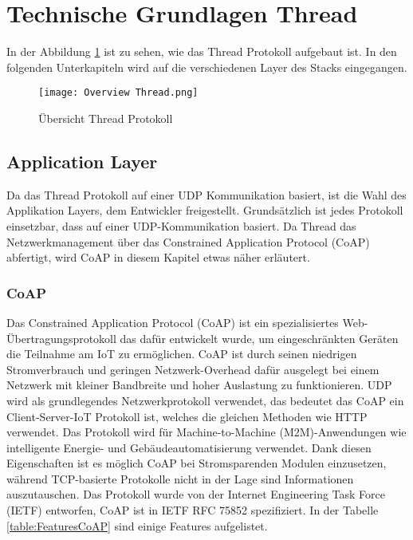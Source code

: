 \clearpage
\section{Technische Grundlagen Thread}\label{sec:TechnischeGrundlagenThread}
In der Abbildung \ref{fig:ÜbersichtThreadProtokoll} ist zu sehen, wie das Thread Protokoll aufgebaut ist. In den folgenden Unterkapiteln wird auf die verschiedenen Layer des Stacks eingegangen.
\begin{figure}[H]
	\centering
	\texttt{[image: Overview Thread.png]}
	\caption{Übersicht Thread Protokoll}\label{fig:ÜbersichtThreadProtokoll}
\end{figure}

\subsection{Application Layer}\label{subsec:CoAP}
Da das Thread Protokoll auf einer UDP Kommunikation basiert, ist die Wahl des Applikation Layers, dem Entwickler freigestellt. Grundsätzlich ist jedes Protokoll einsetzbar, dass auf einer UDP-Kommunikation basiert. Da Thread das Netzwerkmanagement über das Constrained Application Protocol (CoAP) abfertigt, wird CoAP in diesem Kapitel etwas näher erläutert.

\subsubsection{CoAP}\label{subsubsec:CoAP}
Das Constrained Application Protocol (CoAP) ist ein spezialisiertes Web-Übertragungsprotokoll das dafür entwickelt wurde, um eingeschränkten Geräten die Teilnahme am IoT zu ermöglichen. CoAP ist durch seinen niedrigen Stromverbrauch und geringen Netzwerk-Overhead dafür ausgelegt bei einem Netzwerk mit kleiner Bandbreite und hoher Auslastung zu funktionieren.  UDP wird als grundlegendes Netzwerkprotokoll verwendet, das bedeutet das CoAP ein Client-Server-IoT Protokoll ist, welches die gleichen Methoden wie HTTP verwendet. Das Protokoll wird für Machine-to-Machine (M2M)-Anwendungen wie intelligente Energie- und Gebäudeautomatisierung verwendet. Dank diesen Eigenschaften ist es möglich CoAP bei Stromsparenden Modulen einzusetzen, während TCP-basierte Protokolle nicht in der Lage sind Informationen auszutauschen. Das Protokoll wurde von der Internet Engineering Task Force (IETF) entworfen, CoAP ist in IETF RFC 75852 spezifiziert. In der Tabelle \ref{table:FeaturesCoAP} sind einige Features aufgelistet. \cite{shelby_constrained_2014}

